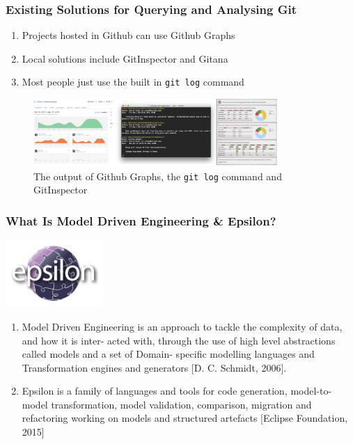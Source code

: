 \documentclass[aspectratio=1610]{beamer}
\newcommand{\code}[1]{\texttt{#1}}
\begin{document}
\begin{frame}
	\frametitle{Existing Solutions for Querying and Analysing Git}
	\begin{enumerate}
		\item Projects hosted in Github can use Github Graphs
		\item Local solutions include GitInspector and Gitana
		\item Most people just use the built in \code{git log} command
	\end{enumerate}
	\begin{figure}[H]
		\centering
		\includegraphics[width=350px]{images/existingsolutions}
		\caption{The output of Github Graphs, the \code{git log} command and GitInspector}
	\end{figure}
\end{frame}

\begin{frame}
	\frametitle{What Is Model Driven Engineering \& Epsilon?}
	\begin{center}
	\includegraphics[width=140px]{images/epsilon}
	\end{center}
	\begin{enumerate}
		\item Model Driven Engineering is an approach to tackle the complexity of data, and how it is inter- acted with, through the use of high level abstractions called models and a set of Domain- specific modelling languages and Transformation engines and generators [D. C. Schmidt, 2006].
		\item Epsilon is a family of languages and tools for code generation, model-to-model transformation, model validation, comparison, migration and refactoring working on models and structured artefacts [Eclipse Foundation, 2015]	
	\end{enumerate}
\end{frame}
\end{document}
